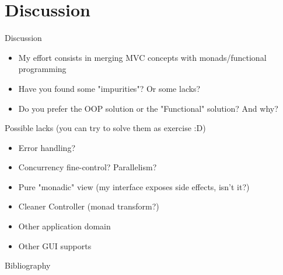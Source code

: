 \documentclass[presentation]{beamer}
\begin{document}
\section{Discussion}
\begin{frame}[fragile]{Discussion}

\begin{itemize}
  \item My effort consists in merging MVC concepts with monads/functional programming
  \item Have you found some "impurities"? Or some lacks?
  \item Do you prefer the OOP solution or the "Functional" solution? And why?
\end{itemize}

\begin{block}{Possible lacks (you can try to solve them as exercise :D)}
\begin{itemize}
  \item Error handling? 
  \item Concurrency fine-control? Parallelism?
  \item Pure "monadic" view (my interface exposes side effects, isn't it?)
  \item Cleaner Controller (monad transform?)
  \item Other application domain
  \item Other GUI supports
\end{itemize}
\end{block}
\end{frame}


\begin{frame}[allowframebreaks]{Bibliography}
\def\bibfont{\footnotesize}
\printbibliography
\end{frame}
\end{document}
